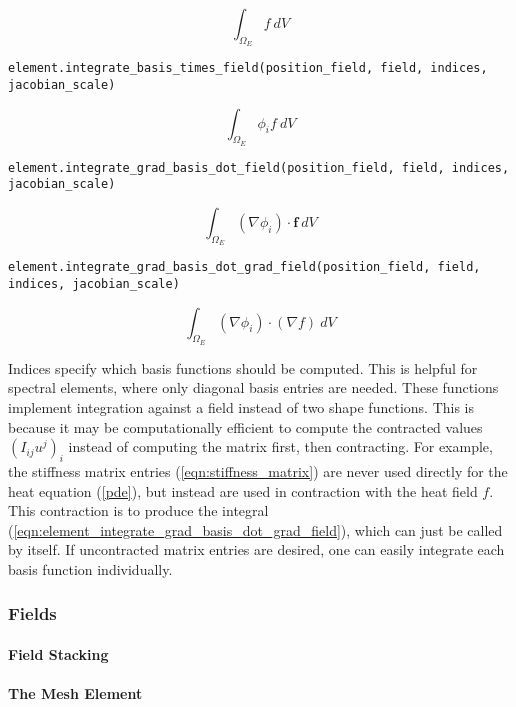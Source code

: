 \begin{equation}
\int_{\Omega_E} f~dV
\label{eqn:element_integrate_field}
\end{equation}

\begin{verbatim}
element.integrate_basis_times_field(position_field, field, indices, jacobian_scale)
\end{verbatim}

\begin{equation}
\int_{\Omega_E} \phi_i f~dV
\label{eqn:element_integrate_basis_times_field}
\end{equation}

\begin{verbatim}
element.integrate_grad_basis_dot_field(position_field, field, indices, jacobian_scale)
\end{verbatim}

\begin{equation}
\int_{\Omega_E} (\nabla \phi_i)\cdot \mathbf{f}~dV
\label{eqn:element_integrate_grad_basis_dot_field}
\end{equation}

\begin{verbatim}
element.integrate_grad_basis_dot_grad_field(position_field, field, indices, jacobian_scale)
\end{verbatim}

\begin{equation}
\int_{\Omega_E} (\nabla \phi_i)\cdot (\nabla f)~dV
\label{eqn:element_integrate_grad_basis_dot_grad_field}
\end{equation}

Indices specify which basis functions should be computed. This is helpful for spectral elements, where only diagonal basis entries are needed. These functions implement integration against a field instead of two shape functions. This is because it may be computationally efficient to compute the contracted values $(I_{ij}u^j)_i$ instead of computing the matrix first, then contracting. For example, the stiffness matrix entries (\ref{eqn:stiffness_matrix}) are never used directly for the heat equation (\ref{pde}), but instead are used in contraction with the heat field $f$. This contraction is to produce the integral (\ref{eqn:element_integrate_grad_basis_dot_grad_field}), which can just be called by itself. If uncontracted matrix entries are desired, one can easily integrate each basis function individually.

\subsubsection{Fields}

\paragraph{Field Stacking}
\paragraph{The Mesh Element}